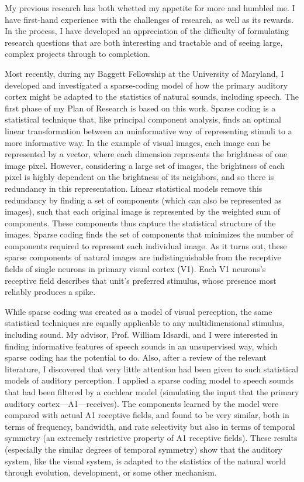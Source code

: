 \documentclass[12pt]{article}
\begin{document}
My previous research has both whetted my appetite for more and humbled me.  I have first-hand experience with the challenges of research, as well as its rewards.  In the process, I have developed an appreciation of the difficulty of formulating research questions that are both interesting and tractable and of seeing large, complex projects through to completion.

Most recently, during my Baggett Fellowship at the University of Maryland, I developed and investigated a sparse-coding model of how the primary auditory cortex might be adapted to the statistics of natural sounds, including speech.  The first phase of my Plan of Research is based on this work.  Sparse coding is a statistical technique that, like principal component analysis, finds an optimal linear transformation between an uninformative way of representing stimuli to a more informative way.  In the example of visual images, each image can be represented by a vector, where each dimension represents the brightness of one image pixel.  However, considering a large set of images, the brightness of each pixel is highly dependent on the brightness of its neighbors, and so there is redundancy in this representation.  Linear statistical models remove this redundancy by finding a set of components (which can also be represented as images), such that each original image is represented by the weighted sum of components.  These components thus capture the statistical structure of the images.  Sparse coding finds the set of components that minimizes the number of components required to represent each individual image.  As it turns out, these sparse components of natural images are indistinguishable from the receptive fields of single neurons in primary visual cortex (V1)\cite{Olshausen1996}.  Each V1 neurons's receptive field describes that unit's preferred stimulus, whose presence most reliably produces a spike.

While sparse coding was created as a model of visual perception, the same statistical techniques are equally applicable to any multidimensional stimulus, including sound.  My advisor, Prof. William Idsardi, and I were interested in finding informative features of speech sounds in an unsupervised way, which sparse coding has the potential to do.  Also, after a review of the relevant literature, I discovered that very little attention had been given to such statistical models of auditory perception.  I applied a sparse coding model to speech sounds that had been filtered by a cochlear model (simulating the input that the primary auditory cortex---A1---receives).  The components learned by the model were compared with actual A1 receptive fields, and found to be very similar, both in terms of frequency, bandwidth, and rate selectivity but also in terms of temporal symmetry\cite{Kleinschmidt2010} (an extremely restrictive property of A1 receptive fields\cite{Simon2007}).  These results (especially the similar degrees of temporal symmetry) show that the auditory system, like the visual system, is adapted to the statistics of the natural world through evolution, development, or some other mechanism.
\end{document}
